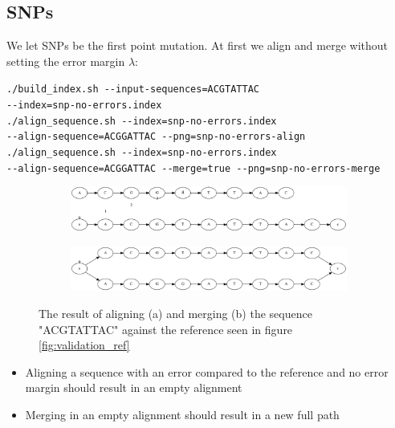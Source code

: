 \documentclass[thesis.tex]{subfiles}
\begin{document}
\subsection*{SNPs}
We let SNPs be the first point mutation. At first we align and merge without setting the error margin $\lambda$:\\
\par\noindent
\texttt{./build\_index.sh -{}-input-sequences=ACGTATTAC\\
-{}-index=snp-no-errors.index}\\
\texttt{./align\_sequence.sh -{}-index=snp-no-errors.index\\
-{}-align-sequence=ACGGATTAC -{}-png=snp-no-errors-align}\\
\texttt{./align\_sequence.sh -{}-index=snp-no-errors.index\\
-{}-align-sequence=ACGGATTAC -{}-merge=true -{}-png=snp-no-errors-merge}\\
\begin{figure}[!h]
  \begin{mdframed}
  \begin{subfigure}[t]{\textwidth}
      \includegraphics[width=\textwidth]{output/snp-no-errors-align.png}
    \subcaption{}
  \end{subfigure}
  \begin{subfigure}[t]{\textwidth}
      \includegraphics[width=\textwidth]{output/snp-no-errors-merge.png}
    \subcaption{}
  \end{subfigure}
  \end{mdframed}
  \caption[Aligning and merging an SNP with \ref{fig:validation_ref} with no error margin]{The result of aligning (a) and merging (b) the sequence "ACGTATTAC" against the reference seen in figure \ref{fig:validation_ref}}
  \label{fig:validation_snp_no_error}
\end{figure}
\begin{itemize}
\item Aligning a sequence with an error compared to the reference and no error margin should result in an empty alignment
\item Merging in an empty alignment should result in a new full path
\end{itemize}
\end{document}
